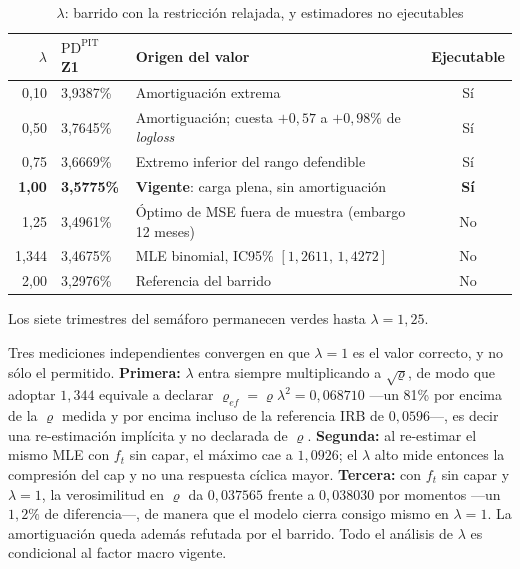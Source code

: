 \documentclass[12pt, a4paper]{article}
\newcommand{\PDPIT}{\ensuremath{\mathrm{PD}^{\mathrm{PIT}}}}
\renewcommand{\rho}{\ensuremath{\varrho}}
\newcommand{\ft}{\ensuremath{f_t}}
\begin{document}
\begin{table}[H]
\centering
\caption{$\lambda$: barrido con la restricción relajada, y estimadores no ejecutables}
\label{tab:sens_lambda}
\small
\begin{tabular}{rlp{7.2cm}c}
\toprule
\textbf{$\lambda$} & \textbf{$\PDPIT$ Z1} & \textbf{Origen del valor} & \textbf{Ejecutable} \\
\midrule
0,10  & 3,9387\% & Amortiguación extrema & Sí \\
0,50  & 3,7645\% & Amortiguación; cuesta $+0{,}57$ a $+0{,}98\%$ de \emph{logloss} & Sí \\
0,75  & 3,6669\% & Extremo inferior del rango defendible & Sí \\
\textbf{1,00} & \textbf{3,5775\%} & \textbf{Vigente}: carga plena, sin amortiguación & \textbf{Sí} \\
1,25  & 3,4961\% & Óptimo de MSE fuera de muestra (embargo 12 meses) & \textcolor{semrojo}{No} \\
1,344 & 3,4675\% & MLE binomial, IC95\% $[1{,}2611,\,1{,}4272]$ & \textcolor{semrojo}{No} \\
2,00  & 3,2976\% & Referencia del barrido & \textcolor{semrojo}{No} \\
\bottomrule
\end{tabular}
\end{table}

\noindent Los siete trimestres del semáforo permanecen verdes hasta $\lambda=1{,}25$.

\noindent Tres mediciones independientes convergen en que $\lambda=1$ es el valor correcto, y no
sólo el permitido. \textbf{Primera:} $\lambda$ entra siempre multiplicando a $\sqrt{\rho}$, de modo
que adoptar $1{,}344$ equivale a declarar $\rho_{ef}=\rho\lambda^2=0{,}068710$ ---un 81\% por
encima de la $\rho$ medida y por encima incluso de la referencia IRB de $0{,}0596$---, es decir una
re-estimación implícita y no declarada de $\rho$. \textbf{Segunda:} al re-estimar el mismo MLE con
$\ft$ sin capar, el máximo cae a $1{,}0926$; el $\lambda$ alto mide entonces la compresión del cap
y no una respuesta cíclica mayor. \textbf{Tercera:} con $\ft$ sin capar y $\lambda=1$, la
verosimilitud en $\rho$ da $0{,}037565$ frente a $0{,}038030$ por momentos ---un $1{,}2\%$ de
diferencia---, de manera que el modelo cierra consigo mismo en $\lambda=1$. La amortiguación queda
además refutada por el barrido. Todo el análisis de $\lambda$ es condicional al factor macro
vigente.
\end{document}
